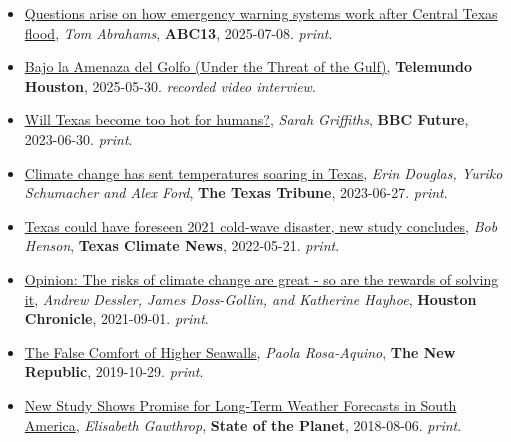 \documentclass[10pt,oneside]{article}
\begin{document}
\begin{itemize}[label={}]
  \item \href{https://abc13.com/post/questions-arise-how-emergency-warning-systems-work-central-texas-flood/17024010/}{Questions arise on how emergency warning systems work after Central Texas flood}, \textit{Tom Abrahams}, \textbf{ABC13}, 2025-07-08.
        \textsl{print}.

  \item \href{https://www.telemundohouston.com/noticias/bajo-la-amenaza-del-golfo-parte-1-2/2494095/}{Bajo la Amenaza del Golfo (Under the Threat of the Gulf)}, \textbf{Telemundo Houston}, 2025-05-30.
        \textsl{recorded video interview}.

  \item \href{https://www.bbc.com/future/article/20230630-will-texas-become-too-hot-for-humans}{Will Texas become too hot for humans?}, \textit{Sarah Griffiths}, \textbf{BBC Future}, 2023-06-30.
        \textsl{print}.

  \item \href{https://www.texastribune.org/2023/06/27/texas-climate-change-heat/}{Climate change has sent temperatures soaring in Texas}, \textit{Erin Douglas, Yuriko Schumacher and Alex Ford}, \textbf{The Texas Tribune}, 2023-06-27.
        \textsl{print}.

  \item \href{https://texasclimatenews.org/2022/05/21/texas-could-have-foreseen-2021-cold-wave-disaster-new-study-concludes/}{Texas could have foreseen 2021 cold-wave disaster, new study concludes}, \textit{Bob Henson}, \textbf{Texas Climate News}, 2022-05-21.
        \textsl{print}.

  \item \href{https://www.houstonchronicle.com/opinion/outlook/article/Opinion-The-risks-of-climate-change-are-great-16426616.php}{Opinion: The risks of climate change are great - so are the rewards of solving it}, \textit{Andrew Dessler, James Doss-Gollin, and Katherine Hayhoe}, \textbf{Houston Chronicle}, 2021-09-01.
        \textsl{print}.

  \item \href{https://newrepublic.com/article/155519/false-comfort-higher-seawalls}{The False Comfort of Higher Seawalls}, \textit{Paola Rosa-Aquino}, \textbf{The New Republic}, 2019-10-29.
        \textsl{print}.

  \item \href{https://blogs.ei.columbia.edu/2018/08/06/subseasonal-weather-forecasts-paraguay/}{New Study Shows Promise for Long-Term Weather Forecasts in South America}, \textit{Elisabeth Gawthrop}, \textbf{State of the Planet}, 2018-08-06.
        \textsl{print}.

\end{itemize}
\end{document}
